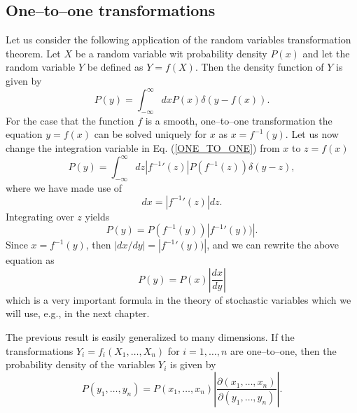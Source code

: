\subsection{One--to--one transformations}
Let us consider the following application of the random variables
transformation theorem. Let $X$ be a random variable wit 
probability density $P(x)$ and let the random variable $Y$ be 
defined as $Y=f(X)$. Then the density function of $Y$ is given by
\begin{equation}\label{ONE_TO_ONE}
P(y) = \int_{-\infty}^{\infty} dx P(x) \delta(y-f(x)).
\end{equation}
For the case that the function $f$ is a smooth, one--to--one
transformation the equation $y=f(x)$ can be solved uniquely for $x$
as $x=f^{-1}(y)$. Let us now change the integration variable in 
Eq. (\ref{ONE_TO_ONE}) from $x$ to $z=f(x)$
\begin{equation*}
P(y) = \int_{-\infty}^{\infty} dz \left| {f^{-1}}'(z) \right|
      P(f^{-1}(z)) \delta(y-z),
\end{equation*}
where we have made use of
\begin{equation*}
dx = \left|{f^{-1}}'(z) \right| dz.
\end{equation*}
Integrating over $z$ yields
\begin{equation*}
P(y) = P(f^{-1}(y)) \left|{f^{-1}}'(y)) \right|.
\end{equation*}
Since $x=f^{-1}(y)$, then $|dx/dy|=|{f^{-1}}'(y))|$, and we can 
rewrite the above equation as
\begin{equation*}
P(y) = P(x) \left|  \frac{dx}{dy} \right|
\end{equation*}
which is a very important formula in the theory of stochastic 
variables which we will use, e.g., in the next chapter.

The previous result is easily generalized to many dimensions.
If the transformations $Y_i =f_i(X_1, \ldots, X_n)$ for $i=1,\ldots,n$ are 
one--to--one, then the probability density of the variables $Y_i$ 
is given by
\begin{equation*}
P(y_1, \ldots, y_n) = P(x_1, \ldots, x_n) 
     \left|  \frac{\partial(x_1, \ldots, x_n)}
     {\partial(y_1, \ldots, y_n)} \right|.
\end{equation*}

